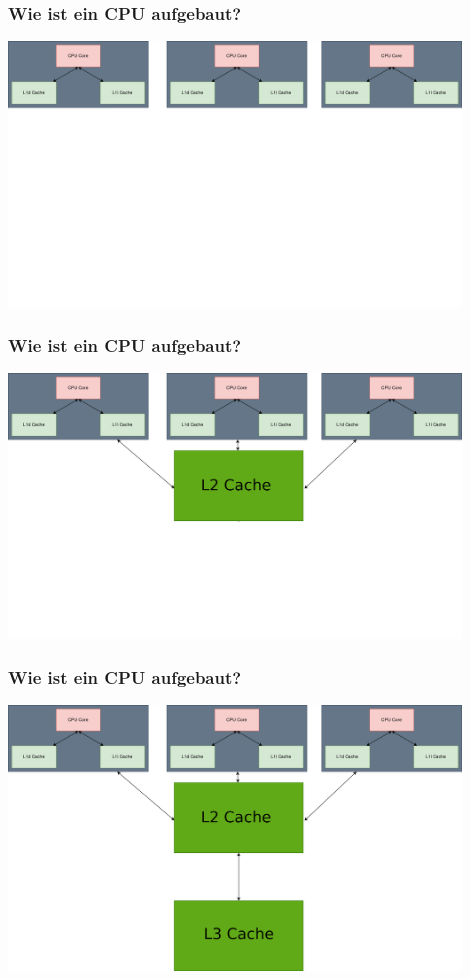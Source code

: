 \documentclass{beamer}
\begin{document}
% 
\begin{frame}[t]
\frametitle{Wie ist ein CPU aufgebaut?}
\centering
\centerline{\includegraphics[width=12cm]{cpu4.png}}
\end{frame}

%
\begin{frame}[t]
\frametitle{Wie ist ein CPU aufgebaut?}
\centering
\centerline{\includegraphics[width=12cm]{cpu5.png}}
\end{frame}

\begin{frame}[t]
\frametitle{Wie ist ein CPU aufgebaut?}
\centering
\centerline{\includegraphics[width=12cm]{cpu6.png}}
\end{frame}
\end{document}
